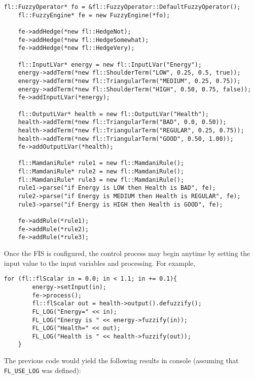 \documentclass[11pt, final, a4paper]{article}
\begin{document}
	\begin{lstlisting}[firstnumber=1,tabsize=2]
	fl::FuzzyOperator* fo = &fl::FuzzyOperator::DefaultFuzzyOperator();
	fl::FuzzyEngine* fe = new FuzzyEngine(*fo);
	
	fe->addHedge(*new fl::HedgeNot);
	fe->addHedge(*new fl::HedgeSomewhat);
	fe->addHedge(*new fl::HedgeVery);
	
	fl::InputLVar* energy = new fl::InputLVar("Energy");
	energy->addTerm(*new fl::ShoulderTerm("LOW", 0.25, 0.5, true));
	energy->addTerm(*new fl::TriangularTerm("MEDIUM", 0.25, 0.75));
	energy->addTerm(*new fl::ShoulderTerm("HIGH", 0.50, 0.75, false));
	fe->addInputLVar(*energy);
	
	fl::OutputLVar* health = new fl::OutputLVar("Health");
	health->addTerm(*new fl::TriangularTerm("BAD", 0.0, 0.50));
	health->addTerm(*new fl::TriangularTerm("REGULAR", 0.25, 0.75));
	health->addTerm(*new fl::TriangularTerm("GOOD", 0.50, 1.00));
	fe->addOutputLVar(*health);
	
	fl::MamdaniRule* rule1 = new fl::MamdaniRule();
	fl::MamdaniRule* rule2 = new fl::MamdaniRule();
	fl::MamdaniRule* rule3 = new fl::MamdaniRule();
	rule1->parse("if Energy is LOW then Health is BAD", fe);
	rule2->parse("if Energy is MEDIUM then Health is REGULAR", fe);
	rule3->parse("if Energy is HIGH then Health is GOOD", fe);
	
	fe->addRule(*rule1);
	fe->addRule(*rule2);
	fe->addRule(*rule3);
	\end{lstlisting}
	
	Once the FIS is configured, the control process may begin anytime by setting the input value to the input variables and processing. For example,
	
	\begin{lstlisting}[firstnumber=last,tabsize=2]
	for (fl::flScalar in = 0.0; in < 1.1; in += 0.1){
		energy->setInput(in);
		fe->process();
		fl::flScalar out = health->output().defuzzify();
		FL_LOG("Energy=" << in);
		FL_LOG("Energy is " << energy->fuzzify(in));
		FL_LOG("Health=" << out);
		FL_LOG("Health is " << health->fuzzify(out));
	}
	\end{lstlisting}
	
	The previous code would yield the following results in console (assuming that \texttt{FL\_USE\_LOG} was defined):
	
\end{document}
